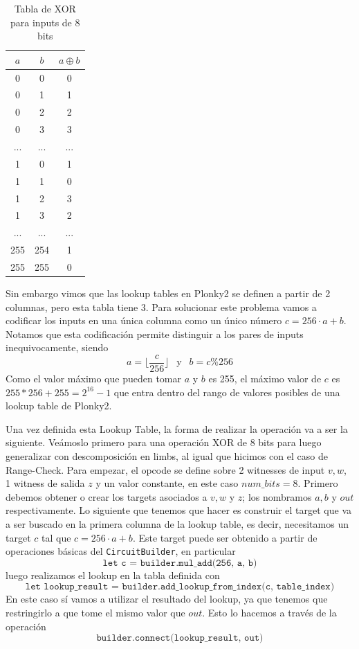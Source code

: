\begin{table}
\begin{center}
\begin{tabular}{ccc}
\toprule
$a$ & $b$ & $a \oplus b$ \\
\midrule
0 & 0 & 0 \\
0 & 1 & 1 \\
0 & 2 & 2 \\
0 & 3 & 3 \\
... & ... & ... \\
1 & 0 & 1 \\
1 & 1 & 0 \\
1 & 2 & 3 \\
1 & 3 & 2 \\
... & ... & ... \\
255 & 254 & 1 \\
255 & 255 & 0 \\
\bottomrule
\end{tabular}
\caption{Tabla de XOR para inputs de 8 bits}
\label{tab:calculo_xor}
\end{center}
\end{table}

Sin embargo vimos que las lookup tables en Plonky2 se definen a partir de 2 columnas, pero esta tabla tiene 3. Para solucionar este problema vamos a codificar los inputs en una única columna como un único número $c = 256\cdot a + b$. Notamos que esta codificación permite distinguir a los pares de inputs inequivocamente, siendo 
$$a = \lfloor \frac{c}{256} \rfloor ~~ \text{ y }~~ b = c \% 256$$
Como el valor máximo que pueden tomar $a$ y $b$ es 255, el máximo valor de $c$ es $255*256+255 = 2^{16}-1$ que entra dentro del rango de valores posibles de una lookup table de Plonky2.

Una vez definida esta Lookup Table, la forma de realizar la operación va a ser la siguiente. Veámoslo primero para una operación XOR de $8$ bits para luego generalizar con descomposición en limbs, al igual que hicimos con el caso de Range-Check. Para empezar, el opcode se define sobre 2 witnesses de input $v,w$, 1 witness de salida $z$ y un valor constante, en este caso $num\_bits = 8$. Primero debemos obtener o crear los targets asociados a $v,w$ y $z$; los nombramos $a,b$ y $out$ respectivamente. Lo siguiente que tenemos que hacer es construir el target que va a ser buscado en la primera columna de la lookup table, es decir, necesitamos un target $c$ tal que $c = 256 \cdot a + b$. Este target puede ser obtenido a partir de operaciones básicas del \texttt{CircuitBuilder}, en particular
\[\texttt{let c = builder.mul\_add(256, a, b)}\]
luego realizamos el lookup en la tabla definida con 
\[\texttt{let lookup\_result = builder.add\_lookup\_from\_index(c, table\_index)}\]
En este caso sí vamos a utilizar el resultado del lookup, ya que tenemos que restringirlo a que tome el mismo valor que $out$. Esto lo hacemos a través de la operación 
\[\texttt{builder.connect(lookup\_result, out)}\]

